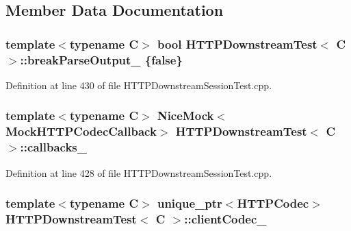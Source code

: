 \subsection{Member Data Documentation}
\subsubsection[{break\+Parse\+Output\+\_\+}]{\setlength{\rightskip}{0pt plus 5cm}template$<$typename C$>$ bool {\bf H\+T\+T\+P\+Downstream\+Test}$<$ C $>$\+::break\+Parse\+Output\+\_\+ \{false\}\hspace{0.3cm}{\ttfamily [protected]}}\label{classHTTPDownstreamTest_ab1a0c2dbbc7f2f60fc446417b28eb559}


Definition at line 430 of file H\+T\+T\+P\+Downstream\+Session\+Test.\+cpp.

\subsubsection[{callbacks\+\_\+}]{\setlength{\rightskip}{0pt plus 5cm}template$<$typename C$>$ Nice\+Mock$<${\bf Mock\+H\+T\+T\+P\+Codec\+Callback}$>$ {\bf H\+T\+T\+P\+Downstream\+Test}$<$ C $>$\+::callbacks\+\_\+\hspace{0.3cm}{\ttfamily [protected]}}\label{classHTTPDownstreamTest_a8985275878cd904b62ca6611e19a40ab}


Definition at line 428 of file H\+T\+T\+P\+Downstream\+Session\+Test.\+cpp.

\subsubsection[{client\+Codec\+\_\+}]{\setlength{\rightskip}{0pt plus 5cm}template$<$typename C$>$ unique\+\_\+ptr$<${\bf H\+T\+T\+P\+Codec}$>$ {\bf H\+T\+T\+P\+Downstream\+Test}$<$ C $>$\+::client\+Codec\+\_\+\hspace{0.3cm}{\ttfamily [protected]}}\label{classHTTPDownstreamTest_a36aee26f5b8dde672ff089fec7224ed8}



